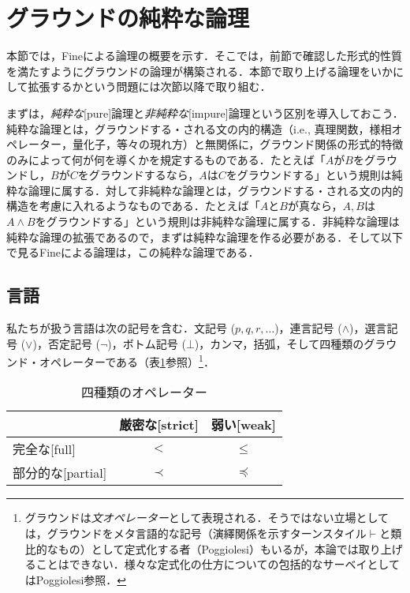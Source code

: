 \documentclass[twoside,14Q,dvipdfmx]{jsarticle}
\theoremstyle{definition}
\begin{document}
\section{グラウンドの純粋な論理}\label{plg}
本節では，Fine\cite{Fine2012a,Fine2012b}による論理の概要を示す．そこでは，前節で確認した形式的性質を満たすようにグラウンドの論理が構築される．本節で取り上げる論理をいかにして拡張するかという問題には次節以降で取り組む．

まずは，\emph{純粋な}[pure]論理と\emph{非純粋な}[impure]論理という区別を導入しておこう．純粋な論理とは，グラウンドする・される文の内的構造（i.e., 真理関数，様相オペレーター，量化子，等々の現れ方）と無関係に，グラウンド関係の形式的特徴のみによって何が何を導くかを規定するものである．たとえば「$A$が$B$をグラウンドし，$B$が$C$をグラウンドするなら，$A$は$C$をグラウンドする」という規則は純粋な論理に属する．対して非純粋な論理とは，グラウンドする・される文の内的構造を考慮に入れるようなものである．たとえば「$A$と$B$が真なら，$A, B$は$A\land B$をグラウンドする」という規則は非純粋な論理に属する．非純粋な論理は純粋な論理の拡張であるので，まずは純粋な論理を作る必要がある．そして以下で見るFineによる論理は，この純粋な論理である．

\subsection{言語}
私たちが扱う言語は次の記号を含む．文記号 ($p, q, r,\ldots$)，連言記号 ($\land$)，選言記号 ($\lor$)，否定記号 ($\lnot$)，ボトム記号 ($\bot$)，カンマ，括弧，そして四種類のグラウンド・オペレーターである（表\ref{operator}参照）\footnote{グラウンドは\emph{文オペレーター}として表現される．そうではない立場としては，グラウンドをメタ言語的な記号（演繹関係を示すターンスタイル$\vdash$と類比的なもの）として定式化する者（Poggiolesi\cite{Poggiolesi2016,Poggiolesi2018}）もいるが，本論では取り上げることはできない．様々な定式化の仕方についての包括的なサーベイとしてはPoggiolesi\cite{Poggiolesi2020}参照．}．

\begin{table}[htb]
\centering
\caption{四種類のオペレーター}\label{operator}
  \begin{tabular}{l|cc}
    & 厳密な[strict] & 弱い[weak] \\ \hline
   完全な[full] & $<$ & $\leq$ \\
    部分的な[partial] & $\prec$ & $\preceq$ \\
  \end{tabular}
\end{table}
\end{document}
